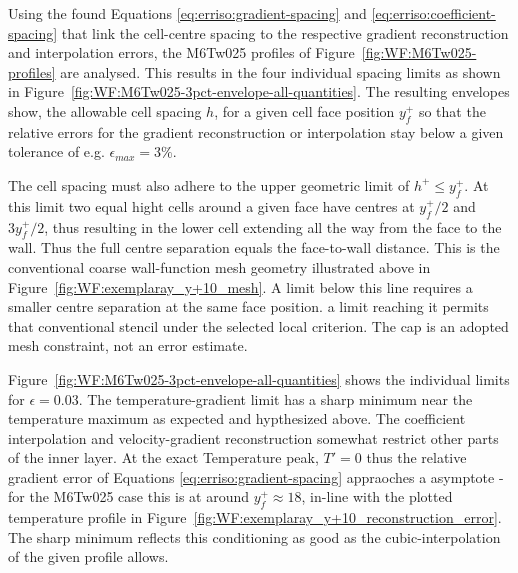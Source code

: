 Using the found Equations \eqref{eq:erriso:gradient-spacing} and \eqref{eq:erriso:coefficient-spacing} that link the cell-centre spacing to the respective gradient reconstruction and interpolation errors, the M6Tw025 profiles of Figure~\ref{fig:WF:M6Tw025-profiles} are analysed. This results in the four individual spacing limits as shown in Figure~\ref{fig:WF:M6Tw025-3pct-envelope-all-quantities}. The resulting envelopes show, the allowable cell spacing $h$, for a given cell face position $y^+_f$ so that the relative errors for the gradient reconstruction or interpolation stay below a given tolerance of e.g. $\epsilon_{max}=3\%$.
\par\medskip

The cell spacing must also adhere to the upper geometric limit of $h^+\leq y_f^+$. At this limit two equal hight cells around a given face have centres at $y_f^+/2$ and $3y_f^+/2$, thus resulting in the lower cell extending all the way from the face to the wall. Thus the full centre separation equals the face-to-wall distance. This is the conventional coarse wall-function mesh geometry illustrated above in Figure~\ref{fig:WF:exemplaray_y+10_mesh}. A limit below this line requires a smaller centre separation at the same face position. a limit reaching it permits that conventional stencil under the selected local criterion. The cap is an adopted mesh constraint, not an error estimate.
\par\medskip

Figure~\ref{fig:WF:M6Tw025-3pct-envelope-all-quantities} shows the individual limits for $\epsilon=0.03$. The temperature-gradient limit has a sharp minimum near the temperature maximum as expected and hypthesized above. The coefficient interpolation and velocity-gradient reconstruction somewhat restrict other parts of the inner layer. At the exact Temperature peak, $T'=0$ thus the relative gradient error of Equations \eqref{eq:erriso:gradient-spacing} appraoches a asymptote - for the M6Tw025 case this is at around $y^+_f\approx 18$, in-line with the plotted temperature profile in Figure~\ref{fig:WF:exemplaray_y+10_reconstruction_error}. The sharp minimum reflects this conditioning as good as the cubic-interpolation of the given profile allows.

